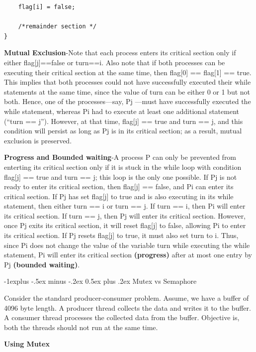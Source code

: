 \documentclass[8pt,landscape]{article}
\makeatletter
\renewcommand{\subsection}{\@startsection{subsection}{2}{0mm}%
                                {-1explus -.5ex minus -.2ex}%
                                {0.5ex plus .2ex}%
                                {\normalfont\scriptsize\bfseries}}
\makeatother
\begin{document}
\begin{multicols}{3}
\begin{tiny}
\begin{verbatim}
    flag[i] = false;

    /*remainder section */
}
\end{verbatim}

\textbf{Mutual Exclusion}-Note that each process enters its critical section only if either 
flag[j]==false or turn==i. Also note that if both processes can be executing their critical 
section at the same time, then flag[0] == flag[1] == true. This implies that both processes could
not have successfully executed their while statements at the same time, since the value of turn
can be either 0 or 1 but not both. Hence, one of the processes—say, Pj —must have successfully 
executed the while statement, whereas Pi had to execute at least one additional statement 
(“turn == j”). However, at that time, flag[j] == true and turn == j, and this condition
will persist as long as Pj is in its critical section; as a result, mutual exclusion is
preserved.

\textbf{Progress and Bounded waiting}-A process P can only be prevented from enterting its critical section only if it
is stuck in the while loop with condition flag[j] == true and turn == j; this loop is the only one
possible. If Pj is not ready to enter its critical section, then flag[j] == false, and Pi can 
enter its critical section. If Pj has set flag[j] to true and is also executing in its while
statement, then either turn == i or turn == j. If turn == i, then Pi will enter its critical 
section. If turn == j, then Pj will enter its critical section. However, once Pj exits its 
critical section, it will reset flag[j] to false, allowing Pi to enter its critical section. If
Pj resets flag[j] to true, it must also set turn to i. Thus, since Pi does not change the value
of the variable turn while executing the while statement, Pi will enter its critical section 
\textbf{(progress)} after at most one entry by Pj \textbf{(bounded waiting)}.

\subsection{Mutex vs Semaphore}

Consider the standard producer-consumer problem. Assume, we have a buffer of 4096 byte length. A producer thread collects the data and writes it to the buffer. A consumer thread processes the collected data from the buffer. Objective is, both the threads should not run at the same time.

\textbf{Using Mutex}


\end{tiny}
\end{multicols}
\end{document}

